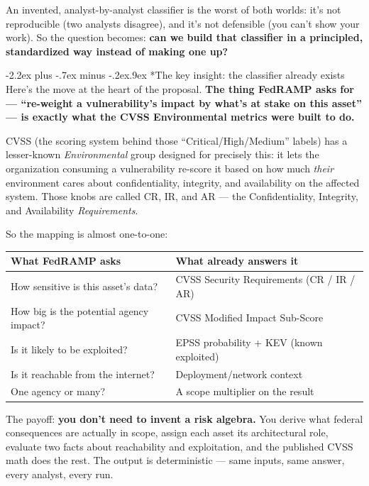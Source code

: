 \documentclass[11pt]{article}
\makeatletter
\renewcommand\section{\@startsection{section}{1}{\z@}%
  {-2.2ex plus -.7ex minus -.2ex}{.9ex}%
  {\normalfont\Large\bfseries}}
\makeatother
\begin{document}
An invented, analyst-by-analyst classifier is the worst of both worlds: it's not
reproducible (two analysts disagree), and it's not defensible (you can't show your
work). So the question becomes: \textbf{can we build that classifier in a
principled, standardized way instead of making one up?}

\section*{The key insight: the classifier already exists}
Here's the move at the heart of the proposal. \textbf{The thing FedRAMP asks for
--- ``re-weight a vulnerability's impact by what's at stake on this asset'' --- is
exactly what the CVSS Environmental metrics were built to do.}

CVSS (the scoring system behind those ``Critical/High/Medium'' labels) has a
lesser-known \emph{Environmental} group designed for precisely this: it lets the
organization consuming a vulnerability re-score it based on how much \emph{their}
environment cares about confidentiality, integrity, and availability on the
affected system. Those knobs are called CR, IR, and AR --- the Confidentiality,
Integrity, and Availability \emph{Requirements}.

So the mapping is almost one-to-one:

\begin{center}
\begin{tabular}{@{}p{2.9in}p{2.9in}@{}}
\toprule
\textbf{What FedRAMP asks} & \textbf{What already answers it} \\
\midrule
How sensitive is this asset's data? & CVSS Security Requirements (CR / IR / AR) \\
How big is the potential agency impact? & CVSS Modified Impact Sub-Score \\
Is it likely to be exploited? & EPSS probability + KEV (known exploited) \\
Is it reachable from the internet? & Deployment/network context \\
One agency or many? & A scope multiplier on the result \\
\bottomrule
\end{tabular}
\end{center}

The payoff: \textbf{you don't need to invent a risk algebra.} You derive what
federal consequences are actually in scope, assign each asset its architectural
role, evaluate two facts about reachability and exploitation, and the published
CVSS math does the rest. The output is deterministic --- same inputs, same answer,
every analyst, every run.
\end{document}
